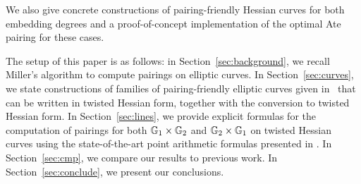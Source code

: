 We also give concrete constructions of pairing-friendly Hessian curves for both embedding degrees and a proof-of-concept implementation of the optimal Ate pairing for these cases. 

The setup of this paper is as follows:
in Section~\ref{sec:background}, we recall Miller's algorithm to compute pairings on elliptic curves.
In Section~\ref{sec:curves}, we state constructions of families of pairing-friendly elliptic curves given in~\cite{2010/freeman}
that can be written in twisted Hessian form, together with the conversion
to twisted Hessian form.
In Section~\ref{sec:lines}, we provide explicit formulas for the computation of 
pairings for both $\mathbb{G}_{1} \times \mathbb{G}_{2}$ and $\mathbb{G}_{2} \times \mathbb{G}_{1}$ 
on twisted Hessian curves
using the state-of-the-art point arithmetic formulas presented in \cite{2015/hessian}.
In Section~\ref{sec:cmp}, we compare our results to previous work.
In Section~\ref{sec:conclude}, we present our conclusions.


